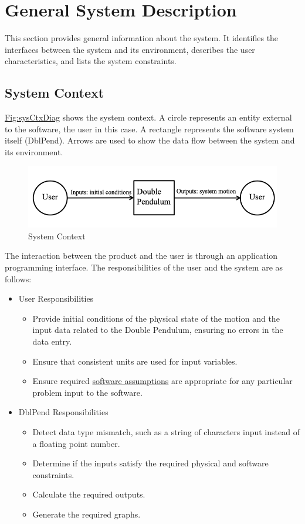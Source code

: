\documentclass[12pt]{article}
\begin{document}
{\section{General System Description}
\label{Sec:GenSysDesc}
This section provides general information about the system. It identifies the interfaces between the system and its environment, describes the user characteristics, and lists the system constraints.

\subsection{System Context}
\label{Sec:SysContext}
\hyperref[Figure:sysCtxDiag]{Fig:sysCtxDiag} shows the system context. A circle represents an entity external to the software, the user in this case. A rectangle represents the software system itself (DblPend). Arrows are used to show the data flow between the system and its environment.

\begin{figure}[H]
\begin{center}
\includegraphics[width=\textwidth]{../../../../datafiles/dblpend/SystemContextFigure.png}
\caption{System Context}
\label{Figure:sysCtxDiag}
\end{center}
\end{figure}
The interaction between the product and the user is through an application programming interface. The responsibilities of the user and the system are as follows:

\begin{itemize}
\item{User Responsibilities}
\begin{itemize}
\item{Provide initial conditions of the physical state of the motion and the input data related to the Double Pendulum, ensuring no errors in the data entry.}
\item{Ensure that consistent units are used for input variables.}
\item{Ensure required \hyperref[Sec:Assumps]{software assumptions} are appropriate for any particular problem input to the software.}
\end{itemize}
\item{DblPend Responsibilities}
\begin{itemize}
\item{Detect data type mismatch, such as a string of characters input instead of a floating point number.}
\item{Determine if the inputs satisfy the required physical and software constraints.}
\item{Calculate the required outputs.}
\item{Generate the required graphs.}
\end{itemize}
\end{itemize}
}
\end{document}
